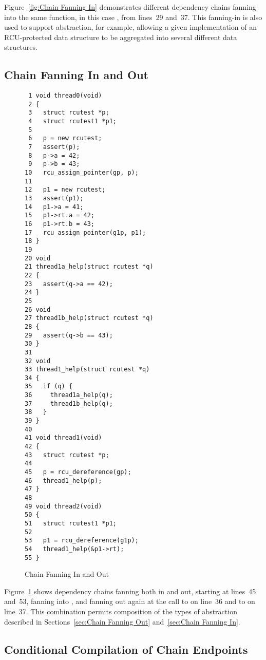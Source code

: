 \documentclass[letterpaper,10pt]{article}
\begin{document}
Figure~\ref{fig:Chain Fanning In}
demonstrates different dependency chains fanning into the same function,
in this case , from lines~29 and~37.
This fanning-in is also used to support abstraction, for example,
allowing a given implementation of an RCU-protected data structure
to be aggregated into several different data structures.

\subsection{Chain Fanning In and Out}
\label{sec:Chain Fanning In and Out}

\begin{figure}[tbp]
{ \scriptsize
\begin{verbatim}
 1 void thread0(void)
 2 {
 3   struct rcutest *p;
 4   struct rcutest1 *p1;
 5
 6   p = new rcutest;
 7   assert(p);
 8   p->a = 42;
 9   p->b = 43;
10   rcu_assign_pointer(gp, p);
11
12   p1 = new rcutest;
13   assert(p1);
14   p1->a = 41;
15   p1->rt.a = 42;
16   p1->rt.b = 43;
17   rcu_assign_pointer(g1p, p1);
18 }
19
20 void
21 thread1a_help(struct rcutest *q)
22 {
23   assert(q->a == 42);
24 }
25
26 void
27 thread1b_help(struct rcutest *q)
28 {
29   assert(q->b == 43);
30 }
31
32 void
33 thread1_help(struct rcutest *q)
34 {
35   if (q) {
36     thread1a_help(q);
37     thread1b_help(q);
38   }
39 }
40
41 void thread1(void)
42 {
43   struct rcutest *p;
44
45   p = rcu_dereference(gp);
46   thread1_help(p);
47 }
48
49 void thread2(void)
50 {
51   struct rcutest1 *p1;
52
53   p1 = rcu_dereference(g1p);
54   thread1_help(&p1->rt);
55 }
\end{verbatim}
}
\caption{Chain Fanning In and Out}
\label{fig:Chain Fanning In and Out}
\end{figure}

Figure~\ref{fig:Chain Fanning In and Out}
shows dependency chains fanning both in and out, starting
at lines~45 and~53, fanning into , and
fanning out again at the call to  on
line~36 and to  on line~37.
This combination permits composition of the types of abstraction
described in
Sections~\ref{sec:Chain Fanning Out}
and~\ref{sec:Chain Fanning In}.

\subsection{Conditional Compilation of Chain Endpoints}
\label{sec:Conditional Compilation of Chain Endpoints}
\end{document}
